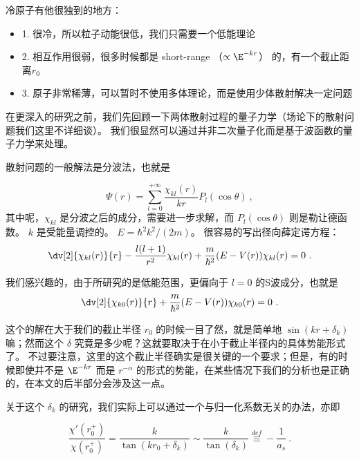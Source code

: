 
冷原子有他很独到的地方：
\begin{itemize}
\item 1. 很冷，所以粒子动能很低，我们只需要一个低能理论
\item 2. 相互作用很弱，很多时候都是 short-range （$\propto \E^{-kr}$） 的，有一个截止距离$r_0$
\item 3. 原子非常稀薄，可以暂时不使用多体理论，而是使用少体散射解决一定问题
\end{itemize}

在更深入的研究之前，我们先回顾一下两体散射过程的量子力学（场论下的散射问题我们这里不详细谈）。 我们很显然可以通过并非二次量子化而是基于波函数的量子力学来处理。

散射问题的一般解法是分波法，也就是

\begin{equation}
\Psi(r) = \sum_{l=0}^{+\infty}\frac{\chi_{kl}(r)}{kr}P_l(\cos\theta) ~,
\end{equation}
其中呢，$\chi_{kl}$ 是分波之后的成分，需要进一步求解，而 $P_l(\cos\theta)$ 则是勒让德函数。 $k$ 是受能量调控的。 $E=\hbar^2 k^2/(2m)$。 很容易的写出径向薛定谔方程：
\begin{equation}
\dv[2]{\chi_{kl}(r)}{r} - \frac{l(l+1)}{r^2}\chi_{kl}(r) + \frac{m}{\hbar^2}(E-V(r))\chi_{kl}(r) = 0~.
\end{equation}

我们感兴趣的，由于所研究的是低能范围，更偏向于 $l=0$ 的S波成分，也就是
\begin{equation}
\dv[2]{\chi_{k0}(r)}{r}+ \frac{m}{\hbar^2}(E-V(r))\chi_{k0}(r) = 0~.
\end{equation}

这个的解在大于我们的截止半径 $r_0$ 的时候一目了然，就是简单地 $\sin(kr + \delta_k)$ 嘛；然而这个 $\delta$ 究竟是多少呢？这就要取决于在小于截止半径内的具体势能形式了。 不过要注意，这里的这个截止半径确实是很关键的一个要求；但是，有的时候即使并不是 $\E^{-kr}$ 而是 $r^{-\alpha}$ 的形式的势能，在某些情况下我们的分析也是正确的，在本文的后半部分会涉及这一点。

关于这个 $\delta_k$ 的研究，我们实际上可以通过一个与归一化系数无关的办法，亦即

\begin{equation}
\frac{\chi'(r_0^+)}{\chi(r_0^+)} = \frac{k}{\tan(k r_0 +\delta_k)} \sim \frac{k}{\tan(\delta_k)} \overset{def}{\equiv} -\frac{1}{a_s} ~.
\end{equation}

